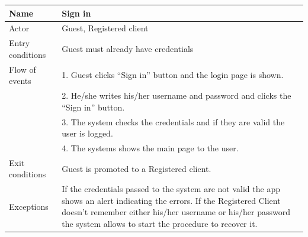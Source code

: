 \begin{table}[!h]
\begin{tabularx}{\linewidth}{l|X}
\centering
Name & Sign in \\ \hline
Actor & Guest, Registered client \\ \hline
Entry conditions & Guest must already have credentials \\ \hline
Flow of events & 1. Guest clicks “Sign in” button and the login page is shown. \\
& 2. He/she writes his/her username and password and clicks the “Sign in” button.\\
& 3. The system checks the credentials and if they are valid the user is logged. \\
& 4. The systems shows the main page to the user. \\ \hline
Exit conditions & Guest is promoted to a Registered client. \\ \hline
Exceptions & If the credentials passed to the system are not valid the app shows an alert indicating the errors. If the Registered Client doesn’t remember either his/her username or his/her password the system allows to start the procedure to recover it. \\
\end{tabularx}
\end{table}

\clearpage
